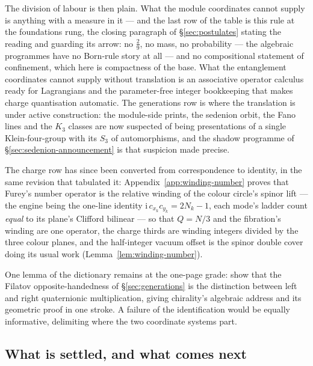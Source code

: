 The division of labour is then plain. What the module coordinates cannot supply is anything with
a measure in it --- and the last row of the table is this rule at the foundations rung, the
closing paragraph of \S\ref{sec:postulates} stating the reading and guarding its arrow: no $\tfrac29$,
no mass, no probability --- the algebraic programmes have no
Born-rule story at all --- and no compositional statement of confinement, which here is
compactness of the base. What the entanglement coordinates cannot supply without translation is
an associative operator calculus ready for Lagrangians and the parameter-free integer bookkeeping
that makes charge quantisation automatic. The generations row is where the translation is under
active construction: the module-side prints, the sedenion orbit, the Fano lines and the $K_3$
classes are now suspected of being presentations of a single Klein-four-group with its $S_3$ of
automorphisms, and the shadow programme of \S\ref{sec:sedenion-announcement} is that suspicion
made precise.

The charge row has since been converted from correspondence to identity, in the same revision
that tabulated it: Appendix~\ref{app:winding-number} proves that Furey's number operator is the
relative winding of the colour circle's spinor lift --- the engine being the one-line identity
$\mathrm{i}\, c_{x_{k}} c_{y_{k}} = 2N_{k} - 1$, each mode's ladder count \emph{equal} to its
plane's Clifford bilinear --- so that $Q = N/3$ and the fibration's winding are one operator,
the charge thirds are winding integers divided by the three colour planes, and the half-integer
vacuum offset is the spinor double cover doing its usual work
(Lemma~\ref{lem:winding-number}).

\begin{openproblem}\label{op:dictionary-lemmas}
One lemma of the dictionary remains at the one-page grade: show that the Filatov
opposite-handedness of \S\ref{sec:generations} is the distinction between left and right
quaternionic multiplication, giving chirality's algebraic address and its geometric proof in one
stroke. A failure of the identification would be equally informative, delimiting where the two
coordinate systems part.
\end{openproblem}

\subsection{What is settled, and what comes next}

